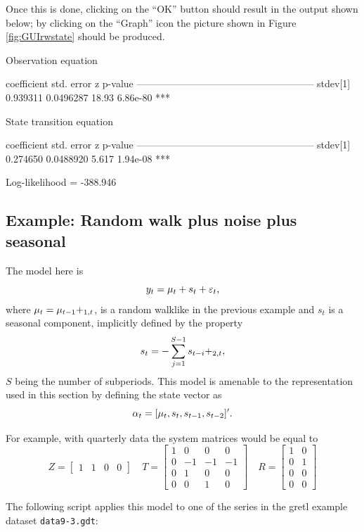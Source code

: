 Once this is done, clicking on the ``OK'' button should result in the
output shown below; by clicking on the ``Graph'' icon the picture
shown in Figure \ref{fig:GUIrwstate} should be produced.

\begin{code}
Observation equation

             coefficient   std. error     z     p-value 
  ------------------------------------------------------
  stdev[1]    0.939311     0.0496287    18.93   6.86e-80 ***


State transition equation

             coefficient   std. error     z     p-value 
  ------------------------------------------------------
  stdev[1]    0.274650     0.0488920    5.617   1.94e-08 ***

  Log-likelihood = -388.946
\end{code}

\subsection{Example: Random walk plus noise plus seasonal}

The model here is
\[
  y_t = \mu_t + s_t + \varepsilon_t,
\]
where $\mu_t = \mu_{t-1} + \relax_{1,t}$, is a random walklike in the previous example
and $s_t$ is a seasonal component, implicitly defined by the property
\[
  s_t = -\sum_{j=1}^{S-1} s_{t-i} + \relax_{2,t},
\]
$S$ being the number of subperiods. This model is amenable to the
representation used in this section by defining the state vector as
\[
  \alpha_t = [ \mu_t, s_t, s_{t-1}, s_{t-2}]' .
\]

For example, with quarterly data the system matrices would be equal
to
\[
  Z = \begin{bmatrix}  1 & 1 & 0 & 0  \end{bmatrix}
  \quad
  T = \begin{bmatrix}
    1 & 0 & 0 & 0 \\
    0 & -1 & -1 & -1 \\
    0 & 1 & 0 & 0 \\
    0 & 0 & 1 & 0
  \end{bmatrix}
  \quad
  R = \begin{bmatrix}  1 & 0 \\ 0 & 1 \\ 0 & 0 \\ 0 & 0   \end{bmatrix}
\]

The following script applies this model to one of the series in the
gretl example dataset \texttt{data9-3.gdt}:

